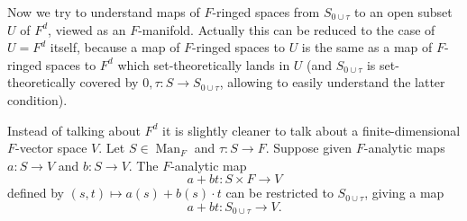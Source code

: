 \documentclass[12pt]{article}
\begin{document}
Now we try to understand maps of $F$-ringed spaces from $S_{0\cup \tau}$ to an open subset $U$ of $F^d$, viewed as an $F$-manifold.  Actually this can be reduced to the case of $U=F^d$ itself, because a map of $F$-ringed spaces to $U$ is the same as a map of $F$-ringed spaces to $F^d$ which set-theoretically lands in $U$ (and $S_{0\cup \tau}$ is set-theoretically covered by $0,\tau:S\rightarrow S_{0\cup\tau}$, allowing to easily understand the latter condition).

Instead of talking about $F^d$ it is slightly cleaner to talk about a finite-dimensional $F$-vector space $V$.  Let $S\in\operatorname{Man}_F$ and $\tau:S\rightarrow F$.  Suppose given $F$-analytic maps $a:S\rightarrow V$ and $b:S\rightarrow V$.  The $F$-analytic map
$$a+bt: S\times F\rightarrow V$$
defined by $(s,t)\mapsto a(s) + b(s)\cdot t$ can be restricted to $S_{0\cup \tau}$, giving a map
$$a+bt: S_{0\cup \tau}\rightarrow V.$$
\end{document}
